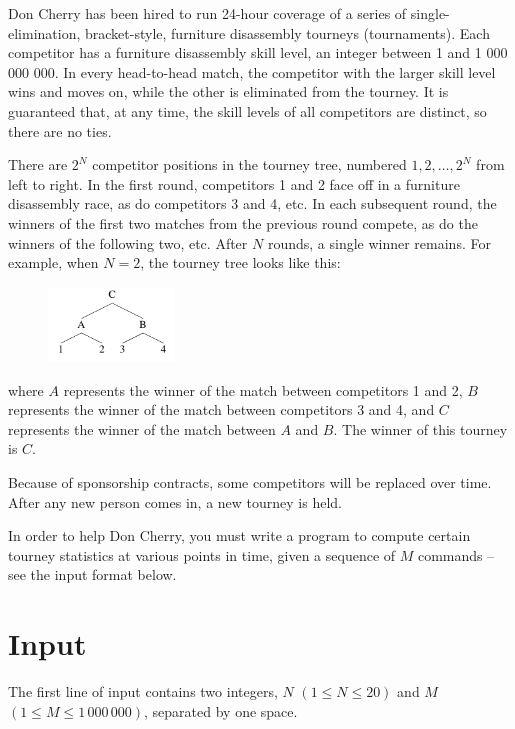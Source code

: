 Don Cherry has been hired to run 24-hour coverage of a series of single-elimination, bracket-style,
furniture disassembly tourneys (tournaments). Each competitor has a furniture disassembly skill
level, an integer between 1 and 1 000 000 000. In every head-to-head match, the competitor with
the larger skill level wins and moves on, while the other is eliminated from the tourney. It is
guaranteed that, at any time, the skill levels of all competitors are distinct, so there are no ties.

There are $2^N$ competitor positions in the tourney tree, numbered $1, 2, \dots, 2^N$ from left to
right. In the first round, competitors 1 and 2 face off in a furniture disassembly race, as do
competitors 3 and 4, etc. In each subsequent round, the winners of the first two matches from the
previous round compete, as do the winners of the following two, etc. After $N$ rounds, a single
winner remains. For example, when $N = 2$, the tourney tree looks like this:

\begin{figure}[h]
    \begin{center}
    \includegraphics[width=0.3\textwidth]{tree}
    \end{center}
\end{figure}
where $A$ represents the winner of the match between competitors 1 and 2, $B$ represents the winner of
the match between competitors 3 and 4, and $C$ represents the winner of the match between $A$ and
$B$. The winner of this tourney is $C$.

Because of sponsorship contracts, some competitors will be replaced over time. After any new person
comes in, a new tourney is held.

In order to help Don Cherry, you must write a program to compute certain tourney statistics at
various points in time, given a sequence of $M$ commands -- see the input format below.

\section*{Input}
The first line of input contains two integers, $N$ $(1 \le N \le 20)$ and $M$ $(1 \le M \le
1\,000\,000)$, separated by one space.


